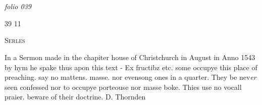 \documentclass[12pt, a4paper]{book}
\begin{document}
            
\dotfill
						\newpage {} \subsection*{}  \subsection*{}  \subsection*{}  \subsection*{}  \subsection*{}  \section*{}

\textit{folio 039}



\begin{flushright}{\color{Mahogany}39} 11\end{flushright}
 

	
				\begin{center} \begin{large} {\scshape Serles} \end{large} \end{center}
			
	
				\marginpar[\vspace{0.5cm}{\textcolor{Gray}{sclaunderous}}]{}
			
		
				\marginpar[\vspace{0.5cm}{\textcolor{Gray}{n}}]{}
			
		
		\ifthenelse{\isodd{\thepage}}
		{\reversemarginpar}
		{\normalmarginpar}
		In a Sermon made in the chapiter house of Christchurch
 in August in Anno 1543 by hym he spake thus
 apon this text - Ex fructibz etc. some occupye this
 place of preaching. say no mattens. masse. nor evensong
 ones in a quarter. They be nev\textit{er} seen confessed
 nor to occupye porteouse nor masse boke. Thies
 use no
			 vocall praier. beware of their doctrine. D. Thornden
 
\end{document}
